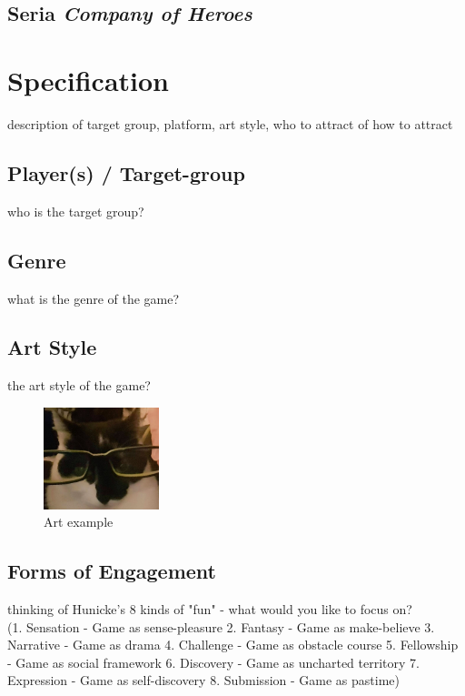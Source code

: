 \documentclass[a4paper]{scrreprt}
\begin{document}
\section{Seria \emph{Company of Heroes}}



\chapter{Specification}
description of target group, platform, art style, who to attract of how to attract 

\section{Player(s) / Target-group}
who is the target group? 

\section{Genre}
what is the genre of the game?

\section{Art Style}
the art style of the game?

\begin{figure}
\centering
\includegraphics[width=0.3\textwidth]{test.jpg}
\caption{\label{fig:art} Art example}
\end{figure}

\section{Forms of Engagement}
thinking of Hunicke's 8 kinds of "fun" - what would you like to focus on?\\
(1. Sensation - Game as sense-pleasure 
2. Fantasy - Game as make-believe
3. Narrative - Game as drama
4. Challenge - Game as obstacle course
5. Fellowship -  Game as social framework
6. Discovery - Game as uncharted territory 
7. Expression - Game as self-discovery 
8. Submission - Game as pastime)
\end{document}
